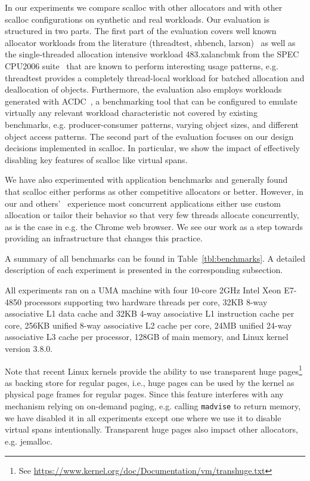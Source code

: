 \documentclass[10pt]{sigplanconf}
\begin{document}
In our experiments we compare scalloc with other allocators and with other scalloc configurations on synthetic and real workloads.
Our evaluation is structured in two parts.
The first part of the evaluation covers well known allocator workloads from
the literature (threadtest, shbench, larson)~\cite{Berger:ASPLOS00,shbench,
Larson:ISMM98} as well as the single-threaded allocation intensive workload
483.xalancbmk from the SPEC CPU2006 suite~\cite{Henning:2006} that are known
to  perform interesting usage patterns, e.g. threadtest provides a completely
thread-local workload for batched allocation and deallocation of objects.
Furthermore, the evaluation also employs workloads generated with ACDC~\cite{Aigner:ISMM13}, a
benchmarking tool that can be configured to emulate virtually any relevant
workload characteristic not covered by existing benchmarks, e.g. 
producer-consumer patterns, varying object sizes, and different object access patterns.
The second part of the evaluation focuses on our design decisions implemented in
scalloc. In particular, we show the impact of effectively
disabling  key features of scalloc like virtual spans.

We have also experimented with application benchmarks and generally found that scalloc either performs as other competitive allocators
or better.  However, in our and others'~\cite{Michael:PLDI04} experience most concurrent applications either use custom allocation or tailor their behavior so that very few threads allocate concurrently, as is the case in e.g. the Chrome web browser. We see our work as a step towards providing an infrastructure that changes this practice. 

A summary of all
benchmarks can be found in Table~\ref{tbl:benchmarks}. A detailed description
of each experiment is presented in the corresponding subsection. 

All experiments ran on a UMA machine with four 10-core 2GHz Intel Xeon E7-4850
processors supporting two hardware threads per core, 32KB 8-way associative L1
data cache and 32KB 4-way associative L1 instruction cache per core, 256KB
unified 8-way associative L2 cache per core, 24MB unified 24-way associative L3
cache per processor, 128GB of main memory, and Linux kernel version 3.8.0.


Note that recent Linux kernels provide the ability to use transparent huge 
pages\footnote{See
\url{https://www.kernel.org/doc/Documentation/vm/transhuge.txt}} as backing
store for regular pages, i.e., huge pages can be used by the kernel as physical
page frames for regular pages. Since this feature interferes with any mechanism
relying on on-demand paging, e.g. calling \texttt{madvise} to return memory, we have
disabled it in all experiments except one where we use it to
disable virtual spans intentionally. 
Transparent huge pages also impact other allocators, e.g. jemalloc.
\end{document}
